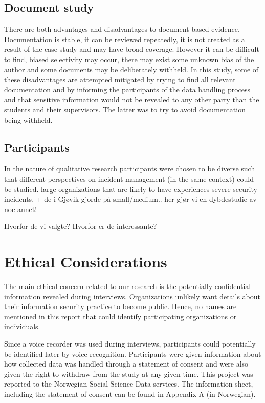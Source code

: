 \subsection{Document study}
\label{sec:documentStudy}
There are both advantages and disadvantages to document-based evidence. Documentation is stable, it can be reviewed repeatedly, it is not created as a result of the case study and may have broad coverage. However it can be difficult to find, biased selectivity may occur, there may exist some unknown bias of the author and some documents may be deliberately withheld. In this study, some of these disadvantages are attempted mitigated by trying to find all relevant documentation and by informing the participants of the data handling process and that sensitive information would not be revealed to any other party than the students and their supervisors. The latter was to try to avoid documentation being withheld.  


\subsection{Participants}
In the nature of qualitative research participants were chosen to be diverse such that different perspectives on incident management (in the same context) could be studied.
large organizations that are likely to have experiences severe security incidents. + de i Gjøvik gjorde på small/medium.. her gjør vi en dybdestudie av noe annet!

Hvorfor de vi valgte? Hvorfor er de interessante?

\section{Ethical Considerations}
\label{sec:ethical}
The main ethical concern related to our research is the potentially confidential information revealed during interviews. Organizations unlikely want details about their information security practice to become public. Hence, no names are mentioned in this report that could identify participating organizations or individuals.

Since a voice recorder was used during interviews, participants could potentially be identified later by voice recognition. Participants were given information about how collected data was handled through a statement of consent and were also given the right to withdraw from the study at any given time. This project was reported to the Norwegian Social Science Data services. The information sheet, including the statement of consent can be found in Appendix A (in Norwegian).  

